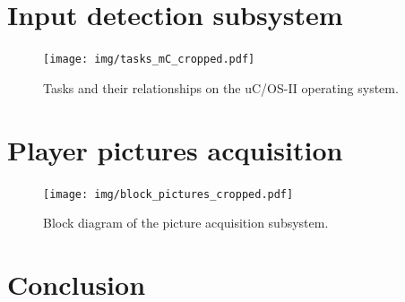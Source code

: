 \documentclass[english, DIV=13]{scrartcl}
\begin{document}
\section{Input detection subsystem}
\label{sec:input-det}

\begin{figure}
    \centering
    \texttt{[image: img/tasks\_mC\_cropped.pdf]}
    \caption{Tasks and their relationships on the uC/OS-II operating system.}
\end{figure}

\section{Player pictures acquisition}
\label{sec:pic-acq}

\begin{figure}
    \centering
    \texttt{[image: img/block\_pictures\_cropped.pdf]}
    \caption{Block diagram of the picture acquisition subsystem.}
\end{figure}

\section{Conclusion}
\end{document}

